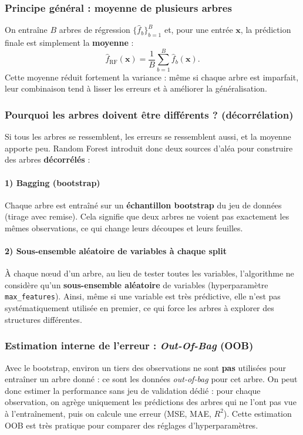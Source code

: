 \documentclass{article}
\theoremstyle{nopointbreak}
\theoremstyle{nobrkbold}
\begin{document}
\subsubsection{Principe général : moyenne de plusieurs arbres}
On entraîne $B$ arbres de régression $\{\hat f_b\}_{b=1}^B$ et, pour une entrée $\mathbf{x}$, la prédiction finale est simplement la \textbf{moyenne} :
\[
\hat f_{\text{RF}}(\mathbf{x})=\frac{1}{B}\sum_{b=1}^{B}\hat f_b(\mathbf{x}).
\]
Cette moyenne réduit fortement la variance : même si chaque arbre est imparfait, leur combinaison tend à lisser les erreurs et à améliorer la généralisation.

\subsubsection{Pourquoi les arbres doivent être différents ? (décorrélation)}
Si tous les arbres se ressemblent, les erreurs se ressemblent aussi, et la moyenne apporte peu. Random Forest introduit donc deux sources d’aléa pour construire des arbres \textbf{décorrélés} :

\paragraph{1) Bagging (bootstrap)}
Chaque arbre est entraîné sur un \textbf{échantillon bootstrap} du jeu de données (tirage avec remise). Cela signifie que deux arbres ne voient pas exactement les mêmes observations, ce qui change leurs découpes et leurs feuilles.

\paragraph{2) Sous-ensemble aléatoire de variables à chaque split}
À chaque nœud d’un arbre, au lieu de tester toutes les variables, l’algorithme ne considère qu’un \textbf{sous-ensemble aléatoire} de variables (hyperparamètre \texttt{max\_features}). Ainsi, même si une variable est très prédictive, elle n’est pas systématiquement utilisée en premier, ce qui force les arbres à explorer des structures différentes.

\subsubsection{Estimation interne de l’erreur : \textit{Out-Of-Bag} (OOB)}
Avec le bootstrap, environ un tiers des observations ne sont \textbf{pas} utilisées pour entraîner un arbre donné : ce sont les données \textit{out-of-bag} pour cet arbre. On peut donc estimer la performance sans jeu de validation dédié :
pour chaque observation, on agrège uniquement les prédictions des arbres qui ne l’ont pas vue à l’entraînement, puis on calcule une erreur (MSE, MAE, $R^2$). Cette estimation OOB est très pratique pour comparer des réglages d’hyperparamètres.
\end{document}
